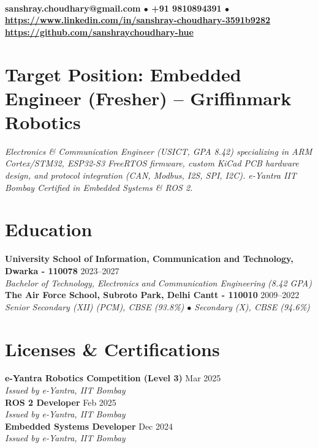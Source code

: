 \documentclass[10pt,a4paper]{article}%
\begin{document}
%
\normalsize%
 \vspace{3pt}\\%
\noindent \textbf{\scriptsize sanshray.choudhary@gmail.com $\bullet$ +91 9810894391 $\bullet$ \href{https://www.linkedin.com/in/sanshray-choudhary-3591b9282}{https://www.linkedin.com/in/sanshray-choudhary-3591b9282} \\ \href{https://github.com/sanshraychoudhary-hue}{https://github.com/sanshraychoudhary-hue}} \vspace{6pt}%

\section*{Target Position: Embedded Engineer (Fresher) -- Griffinmark Robotics}%
\noindent \textit{Electronics \& Communication Engineer (USICT, GPA 8.42) specializing in ARM Cortex/STM32, ESP32-S3 FreeRTOS firmware, custom KiCad PCB hardware design, and protocol integration (CAN, Modbus, I2S, SPI, I2C). e-Yantra IIT Bombay Certified in Embedded Systems \& ROS 2.} \vspace{6pt}%

\section*{Education}%
\noindent \textbf{University School of Information, Communication and Technology, Dwarka - 110078} \hfill 2023--2027 \\%
\indent \textit{Bachelor of Technology, Electronics and Communication Engineering (8.42 GPA)} \vspace{6pt}\\%
\noindent \textbf{The Air Force School, Subroto Park, Delhi Cantt - 110010} \hfill 2009--2022 \\%
\indent \textit{Senior Secondary (XII) (PCM), CBSE (93.8\%) $\bullet$ Secondary (X), CBSE (94.6\%)} \vspace{6pt}%

\section*{Licenses \& Certifications}%
\noindent \textbf{e-Yantra Robotics Competition (Level 3)} \hfill Mar 2025 \\%
\indent \textit{Issued by e-Yantra, IIT Bombay} \vspace{4pt}\\%
\noindent \textbf{ROS 2 Developer} \hfill Feb 2025 \\%
\indent \textit{Issued by e-Yantra, IIT Bombay} \vspace{4pt}\\%
\noindent \textbf{Embedded Systems Developer} \hfill Dec 2024 \\%
\indent \textit{Issued by e-Yantra, IIT Bombay} \vspace{6pt}%
\end{document}
